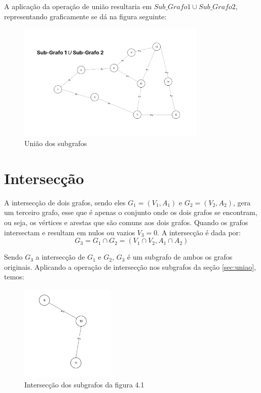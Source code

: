 \documentclass[
12pt,
a4paper,
semrecuonosumario,
sumario = abnt-6027-2012]{report}
\begin{document}
    A aplicação da operação de união resultaria em $Sub\_Grafo1 \cup Sub\_Grafo2$, representando graficamente se dá na figura seguinte:

    \begin{figure}
        \centering
        \includegraphics[width=0.8\textwidth]{figuras/subgrafos/subgrafo1usubgrafo2.png}
        \caption{União dos subgrafos}
        \label{fig:uniaoGrafos}
    \end{figure}

	\section{Intersecção}\label{sec:interseccao}
        A intersecção de dois grafos, sendo eles $G_1 = (V_1, A_1)$ e $G_2 = (V_2, A_2)$, gera um terceiro grafo, esse que é apenas o conjunto onde os dois grafos se encontram, ou seja, os vértices e arestas que são comuns aos dois grafos. Quando os grafos intersectam e resultam em nulos ou vazios $V_3 = 0$. A intersecção é dada por:
        \[
        G_3 = G_1 \cap G_2 = (V_1 \cap V_2, A_1 \cap A_2)
        \]

        Sendo $G_3$ a intersecção de $G_1$ e $G_2$, $G_3$ é um subgrafo de ambos os grafos originais.
        Aplicando a operação de intersecção nos subgrafos da seção \ref{sec:uniao}, temos:

        \begin{figure}[!h]
            \centering
            \includegraphics[width=0.4\textwidth]{figuras/subgrafos/subgrafo_inter.png}
            \caption{Intersecção dos subgrafos da figura 4.1}
            \label{fig:intersecaoGrafos}
        \end{figure}
\end{document}
